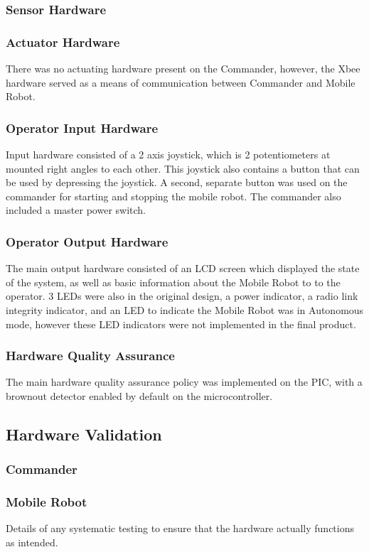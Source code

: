 \documentclass[11pt,a4paper]{article}
\begin{document}
    \subsubsection{Sensor Hardware}
    \subsubsection{Actuator Hardware}
      There was no actuating hardware present on the Commander, however, the Xbee hardware served as a means of communication between Commander and Mobile Robot.
    \subsubsection{Operator Input Hardware}
      Input hardware consisted of a 2 axis joystick, which is 2 potentiometers at mounted right angles to each other. This joystick also contains a button that can be used by depressing the joystick. A second, separate button was used on the commander for starting and stopping the mobile robot. The commander also included a master power switch.
    \subsubsection{Operator Output Hardware}
      The main output hardware consisted of an LCD screen which displayed the state of the system, as well as basic information about the Mobile Robot to to the operator. 3 LEDs were also in the original design, a power indicator, a radio link integrity indicator, and an LED to indicate the Mobile Robot was in Autonomous mode, however these LED indicators were not implemented in the final product.
    \subsubsection{Hardware Quality Assurance}
      The main hardware quality assurance policy was implemented on the PIC, with a brownout detector enabled by default on the microcontroller.\\

  \subsection{Hardware Validation}
    \subsubsection{Commander}
    \subsubsection{Mobile Robot}
  Details of any systematic testing to ensure that the hardware actually functions as intended.
\end{document}
